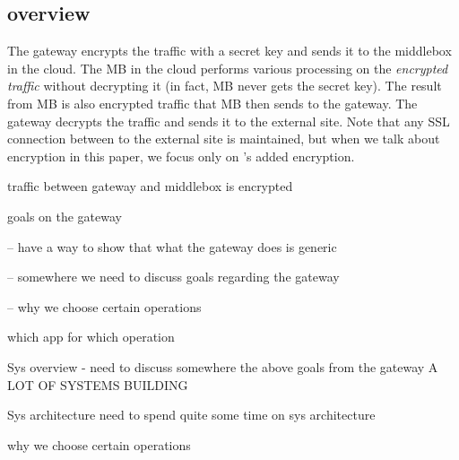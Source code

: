 \subsection{\sys overview}


The gateway encrypts
the traffic with a secret key and sends it to the middlebox in the cloud. The MB in the cloud performs various processing 
on the {\em encrypted traffic} without decrypting it (in fact, MB never gets the secret key). The result from MB is also encrypted traffic
that MB then sends to the gateway. The gateway decrypts the traffic and sends it to the external site. 
Note that any SSL connection between to the external site is maintained, but when we talk about encryption in this paper, we focus only
on \sys's added encryption. 


traffic between gateway and middlebox is encrypted

goals on the gateway

-- have a way to show that what the gateway does is generic 
   
-- somewhere we need to discuss goals regarding the gateway

-- why we choose certain operations

which app for which operation

Sys overview
- need to discuss somewhere the above goals from the gateway
A LOT OF SYSTEMS BUILDING

Sys architecture
need to spend quite some time on sys architecture

why we choose certain operations

